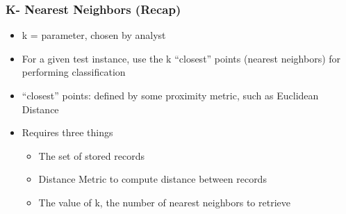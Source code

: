 %
%
%
%

\begin{frame}[fragile]\frametitle{K- Nearest Neighbors (Recap)}
\begin{itemize}
\item k = parameter, chosen by analyst
\item For a given test instance, use the k ``closest'' points (nearest neighbors) for performing classification
\item ``closest'' points: defined by some proximity metric, such as Euclidean Distance
\item Requires three things
	\begin{itemize}
	\item The set of stored records
	\item Distance Metric to compute distance between records
	\item The value of k, the number of nearest neighbors to retrieve
	\end{itemize}
\end{itemize}
\end{frame}




